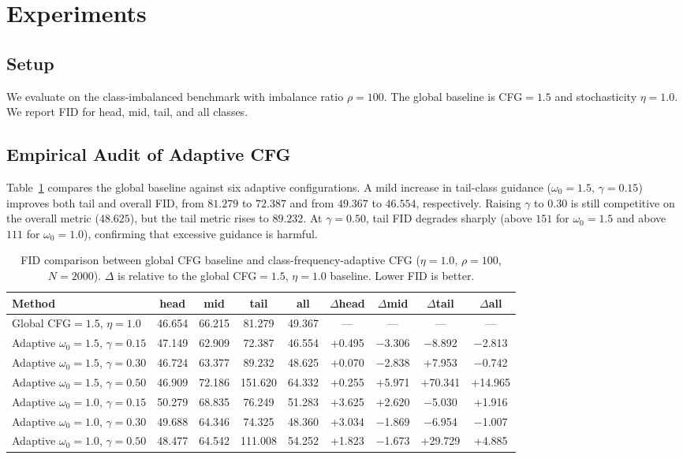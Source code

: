 \documentclass[journal]{IEEEtran}
\begin{document}
\section{Experiments}

\subsection{Setup}
We evaluate on the class-imbalanced benchmark with imbalance ratio $\rho=100$. The global baseline is CFG$=1.5$ and stochasticity $\eta=1.0$. We report FID for head, mid, tail, and all classes.

\subsection{Empirical Audit of Adaptive CFG}
Table~\ref{tab:adaptive-cfg} compares the global baseline against six adaptive configurations. A mild increase in tail-class guidance ($\omega_0=1.5$, $\gamma=0.15$) improves both tail and overall FID, from $81.279$ to $72.387$ and from $49.367$ to $46.554$, respectively. Raising $\gamma$ to $0.30$ is still competitive on the overall metric ($48.625$), but the tail metric rises to $89.232$. At $\gamma=0.50$, tail FID degrades sharply (above $151$ for $\omega_0=1.5$ and above $111$ for $\omega_0=1.0$), confirming that excessive guidance is harmful.

\begin{table}[htbp]
\centering
\caption{FID comparison between global CFG baseline and class-frequency-adaptive CFG ($\eta=1.0$, $\rho=100$, $N=2000$). $\Delta$ is relative to the global CFG$=1.5$, $\eta=1.0$ baseline. Lower FID is better.}
\label{tab:adaptive-cfg}
\begin{tabular}{@{}lcccccccc@{}}
\toprule
Method & head & mid & tail & all & $\Delta$head & $\Delta$mid & $\Delta$tail & $\Delta$all \\
\midrule
Global CFG$=1.5$, $\eta=1.0$ & 46.654 & 66.215 & 81.279 & 49.367 & --- & --- & --- & --- \\
\midrule
Adaptive $\omega_0=1.5$, $\gamma=0.15$ & 47.149 & 62.909 & 72.387 & 46.554 & +0.495 & $-$3.306 & $-$8.892 & $-$2.813 \\
Adaptive $\omega_0=1.5$, $\gamma=0.30$ & 46.724 & 63.377 & 89.232 & 48.625 & +0.070 & $-$2.838 & +7.953 & $-$0.742 \\
Adaptive $\omega_0=1.5$, $\gamma=0.50$ & 46.909 & 72.186 & 151.620 & 64.332 & +0.255 & +5.971 & +70.341 & +14.965 \\
Adaptive $\omega_0=1.0$, $\gamma=0.15$ & 50.279 & 68.835 & 76.249 & 51.283 & +3.625 & +2.620 & $-$5.030 & +1.916 \\
Adaptive $\omega_0=1.0$, $\gamma=0.30$ & 49.688 & 64.346 & 74.325 & 48.360 & +3.034 & $-$1.869 & $-$6.954 & $-$1.007 \\
Adaptive $\omega_0=1.0$, $\gamma=0.50$ & 48.477 & 64.542 & 111.008 & 54.252 & +1.823 & $-$1.673 & +29.729 & +4.885 \\
\bottomrule
\end{tabular}
\end{table}
\end{document}
